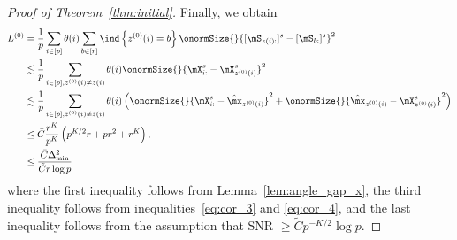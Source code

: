 \documentclass[lettersize,onecolumn,journal]{IEEEtran}
\theoremstyle{definition}
\newtheorem{cor}{Corollary}
\theoremstyle{definition}
\newcommand{\of}[1]{\left(#1\right)}
\newcommand{\offf}[1]{\left\{#1\right\}}
\begin{document}
\begin{proof}[Proof of Theorem~\ref{thm:initial}]
Finally, we obtain 
\begin{align}
     L^{(0)} &= \frac{1}{p}  \sum_{i \in [p]} \theta(i) \sum_{b \in [r]}  \ind \offf{ z^{(0)}(i) = b } \onormSize{}{ [ \mS_{  z(i):}  ]^s - [ \mS_{b:}  ]^s  }^2 \\
     & \lesssim \frac{1}{p}  \sum_{i \in [p], z^{(0)}(i) \neq z(i)} \theta(i)  \onormSize{}{ \mX_{i:}^s -  \mX_{z^{(0)}(i)}^s  }^2\\
     & \lesssim \frac{1}{p}  \sum_{i \in [p], z^{(0)}(i) \neq z(i)} \theta(i) \of{ \onormSize{}{\mX_{i:}^s - \hat \mx_{z^{(0)}(i)}}^2 + \onormSize{}{ \hat \mx_{z^{(0)}(i)} - \mX_{z^{(0)}(i)}^s  }^2 } \\
     & \leq \bar C \frac{r^{K}}{p^{K}} \of{ p^{K/2}r + pr^2 + r^K}, \\
     & \leq \frac{\bar C\Delta_{\min}^2}{ \tilde C r \log p}
\end{align}
where the first inequality follows from Lemma~\ref{lem:angle_gap_x}, the third inequality follows from inequalities~\eqref{eq:cor_3} and \eqref{eq:cor_4}, and the last inequality follows from the assumption that SNR $\geq \tilde C p^{-K/2} \log p$.
    
    
\end{proof}








\end{document}
